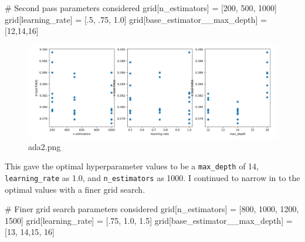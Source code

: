 \documentclass[
  letterpaper,
  DIV=11,
  numbers=noendperiod]{scrartcl}
\newenvironment{Shaded}{\begin{snugshade}}{\end{snugshade}}
\newcommand{\CommentTok}[1]{\textcolor[rgb]{0.37,0.37,0.37}{#1}}
\newcommand{\DecValTok}[1]{\textcolor[rgb]{0.68,0.00,0.00}{#1}}
\newcommand{\FloatTok}[1]{\textcolor[rgb]{0.68,0.00,0.00}{#1}}
\newcommand{\NormalTok}[1]{\textcolor[rgb]{0.00,0.23,0.31}{#1}}
\newcommand{\OperatorTok}[1]{\textcolor[rgb]{0.37,0.37,0.37}{#1}}
\newcommand{\StringTok}[1]{\textcolor[rgb]{0.13,0.47,0.30}{#1}}
\begin{document}
\begin{Shaded}
\begin{Highlighting}[]
\CommentTok{\# Second pass parameters considered}
\NormalTok{grid[}\StringTok{\textquotesingle{}n\_estimators\textquotesingle{}}\NormalTok{] }\OperatorTok{=}\NormalTok{ [}\DecValTok{200}\NormalTok{, }\DecValTok{500}\NormalTok{, }\DecValTok{1000}\NormalTok{]}
\NormalTok{grid[}\StringTok{\textquotesingle{}learning\_rate\textquotesingle{}}\NormalTok{] }\OperatorTok{=}\NormalTok{ [}\FloatTok{.5}\NormalTok{, }\FloatTok{.75}\NormalTok{, }\FloatTok{1.0}\NormalTok{]}
\NormalTok{grid[}\StringTok{\textquotesingle{}base\_estimator\_\_max\_depth\textquotesingle{}}\NormalTok{] }\OperatorTok{=}\NormalTok{ [}\DecValTok{12}\NormalTok{,}\DecValTok{14}\NormalTok{,}\DecValTok{16}\NormalTok{]}
\end{Highlighting}
\end{Shaded}

\begin{figure}

{\centering \includegraphics{Project_Report_Saturn_files/figure-pdf/ada2.png}

}

\caption{ada2.png}

\end{figure}

This gave the optimal hyperparameter values to be a \texttt{max\_depth}
of 14, \texttt{learning\_rate} as 1.0, and \texttt{n\_estimators} as
1000. I continued to narrow in to the optimal values with a finer grid
search.

\begin{Shaded}
\begin{Highlighting}[]
\CommentTok{\# Finer grid search parameters considered}
\NormalTok{grid[}\StringTok{\textquotesingle{}n\_estimators\textquotesingle{}}\NormalTok{] }\OperatorTok{=}\NormalTok{ [}\DecValTok{800}\NormalTok{, }\DecValTok{1000}\NormalTok{, }\DecValTok{1200}\NormalTok{, }\DecValTok{1500}\NormalTok{]}
\NormalTok{grid[}\StringTok{\textquotesingle{}learning\_rate\textquotesingle{}}\NormalTok{] }\OperatorTok{=}\NormalTok{ [}\FloatTok{.75}\NormalTok{, }\FloatTok{1.0}\NormalTok{, }\FloatTok{1.5}\NormalTok{]}
\NormalTok{grid[}\StringTok{\textquotesingle{}base\_estimator\_\_max\_depth\textquotesingle{}}\NormalTok{] }\OperatorTok{=}\NormalTok{ [}\DecValTok{13}\NormalTok{, }\DecValTok{14}\NormalTok{,}\DecValTok{15}\NormalTok{, }\DecValTok{16}\NormalTok{]}
\end{Highlighting}
\end{Shaded}
\end{document}
